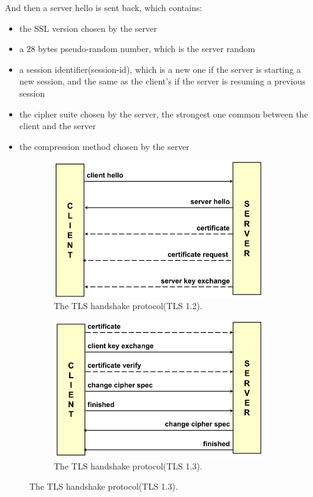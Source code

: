 And then a server hello is sent back, which contains:
\begin{itemize}
  \item the SSL version chosen by the server
  \item a 28 bytes pseudo-random number, which is the server random
  \item a session identifier(session-id), which is a new one if the
    server is starting a new session, and the same as the client's if
    the server is resuming a previous session
  \item the cipher suite chosen by the server, the strongest one
    common between the client and the server
  \item the compression method chosen by the server
\end{itemize}


\begin{figure}[H]
  \centering
  \begin{subfigure}{.5\textwidth}
    \centering
    \includegraphics[width=.9\linewidth]{img/TLS key echange.png}
    \caption{The TLS handshake protocol(TLS 1.2).}
    \label{fig:tls-handshake-protocol-1.2}
  \end{subfigure}%
  \begin{subfigure}{.5\textwidth}
    \centering
    \includegraphics[width=.9\linewidth]{img/TLS key exchange 1-3.png}
    \caption{The TLS handshake protocol(TLS 1.3).}
    \label{fig:tls-handshake-protocol-1.3}
  \end{subfigure}
\end{figure}

